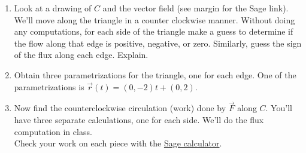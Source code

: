 \begin{problem}
\begin{enumerate}
\item Look at a drawing of $C$ and the vector field (see margin for the Sage link).  We'll move along the triangle in a counter clockwise manner. Without doing any computations, for each side of the triangle make a guess to determine if the flow along that edge is positive, negative, or zero. Similarly, guess the sign of the flux along each edge.  Explain. 
\item Obtain three parametrizations for the triangle, one for each edge.  One of the parametrizations is $\vec r(t) = (0,-2)t+(0,2)$. 
\item Now find the counterclockwise circulation (work) done by $\vec F$ along $C$.  You'll have three separate calculations, one for each side. We'll do the flux computation in class. \\ Check your work on each piece with the \href{\sageworkfluxurl}{Sage calculator}. 
\end{enumerate}
\end{problem}


